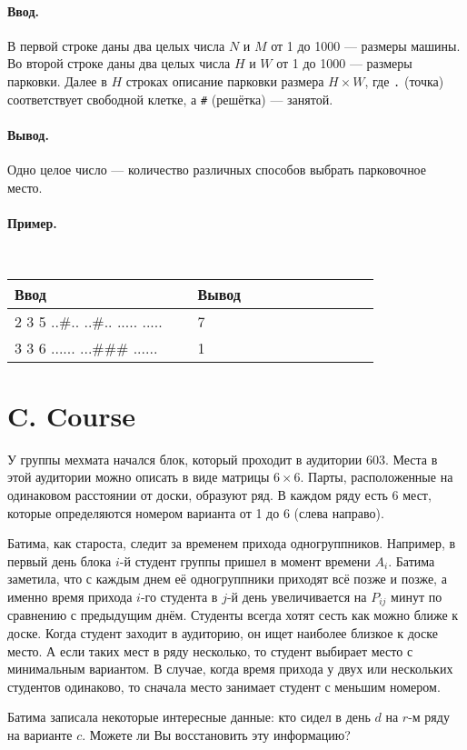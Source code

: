 \documentclass[10pt, a5paper]{article}
\newcommand{\informat}[1]
{
	\paragraph{Ввод.\\} #1
}
\newcommand{\outformat}[1]
{
	\paragraph{Вывод.\\} #1
}
\newcommand{\examplee}[4]
{
	\paragraph{Пример.\\}
	{\tt
	\begin{tabular}{|p{0.4\linewidth}|p{0.4\linewidth}|}
	\hline
	Ввод 	& Вывод  	\\
	\hline
	#1 		& #2 		\\
	\hline
	#3		& #4		\\
	\hline
	\end{tabular}
	}
}
\begin{document}
\informat{В первой строке даны два целых числа $N$ и $M$ от 1 до 1000 --- размеры машины. \newline 
Во второй строке даны два целых числа $H$ и $W$ от 1 до 1000 --- размеры парковки.\newline 
Далее в $H$ строках описание парковки размера $H \times W$, где {\tt .} (точка)  соответствует свободной клетке, а {\tt \#} (решётка) --- занятой.}

\outformat{Одно целое число --- количество различных способов выбрать парковочное место.}

\examplee
{2 3 \newline
4 5 \newline
..\#.. \newline
..\#.. \newline
..... \newline
.....}
{7}
{3 3 \newline
3 6 \newline
...... \newline
...\#\#\# \newline
......}
{1}



\section*{C. Course}


У группы мехмата начался блок, который проходит в аудитории $603$. Места в этой аудитории можно описать в виде матрицы $6 \times 6$. Парты, расположенные на одинаковом расстоянии от доски, образуют ряд. В каждом ряду есть 6 мест, которые определяются номером варианта от 1 до 6 (слева направо).

Батима, как староста, следит за временем прихода одногруппников. Например, в первый день блока $i$-й студент группы пришел в момент времени $A_i$. Батима заметила, что с каждым днем её одногруппники приходят всё позже и позже, а именно время прихода $i$-го студента в $j$-й день увеличивается на $P_{ij}$ минут по сравнению с предыдущим днём. Студенты всегда хотят сесть как можно ближе к доске. Когда студент заходит в аудиторию, он ищет наиболее близкое к доске место. А если таких мест в ряду несколько, то студент выбирает место с минимальным вариантом. В случае, когда время прихода у двух или нескольких студентов одинаково, то сначала место занимает студент с меньшим номером. 

Батима записала некоторые интересные данные: кто сидел в день $d$ на $r$-м ряду на варианте $c$. Можете ли Вы восстановить эту информацию?
\end{document}

